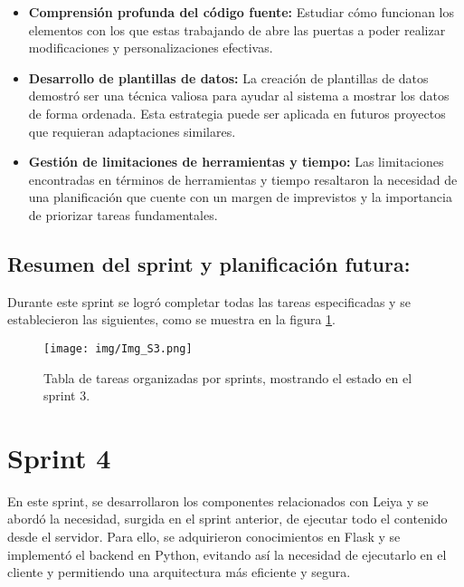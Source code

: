 \documentclass[a4paper, 12pt]{book}
\begin{document}
        \begin{itemize}
    
            \item \textbf{Comprensión profunda del código fuente:} Estudiar cómo funcionan los elementos con los que estas trabajando de abre las puertas a poder realizar modificaciones y personalizaciones efectivas.
        
            \item \textbf{Desarrollo de plantillas de datos:} La creación de plantillas de datos  demostró ser una técnica valiosa para ayudar al sistema a mostrar los datos de forma ordenada. Esta estrategia puede ser aplicada en futuros proyectos que requieran adaptaciones similares.
        
            \item \textbf{Gestión de limitaciones de herramientas y tiempo:} Las limitaciones encontradas en términos de herramientas y tiempo resaltaron la necesidad de una planificación que cuente con un margen de imprevistos y la importancia de priorizar tareas fundamentales.
        
        \end{itemize}

            \subsection{Resumen del sprint y planificación futura:}

            Durante este sprint se logró completar todas las tareas especificadas y se establecieron las siguientes, como se muestra en la figura \ref{fig:Img_S3}.
            \begin{figure}[H]
                \centering
                \texttt{[image: img/Img\_S3.png]}
                                \caption{\footnotesize Tabla de tareas organizadas por sprints, mostrando el estado en el sprint 3.}
                \label{fig:Img_S3}
            \end{figure}     




    \newpage
    \section{Sprint 4}

    En este sprint, se desarrollaron los componentes relacionados con Leiya y se abordó la necesidad, surgida en el sprint anterior, de ejecutar todo el contenido desde el servidor. Para ello, se adquirieron conocimientos en Flask y se implementó el backend en Python, evitando así la necesidad de ejecutarlo en el cliente y permitiendo una arquitectura más eficiente y segura.
\end{document}
